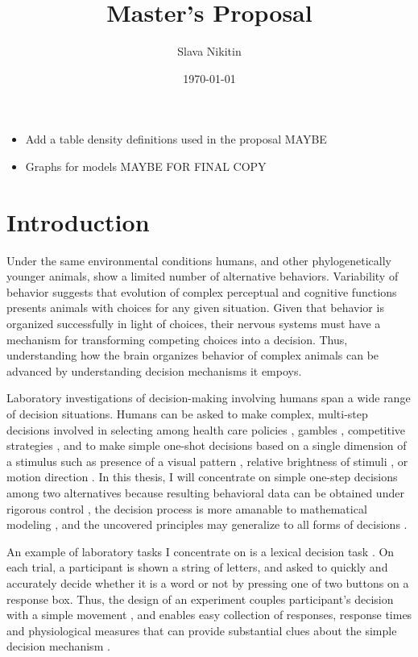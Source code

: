 \documentclass[12pt]{report}
\title{Master's Proposal}
\author{Slava Nikitin}
\date{\today}
\begin{document}
\maketitle

\tableofcontents

\listoftodos
\begin{itemize}
\item Add a table density definitions used in the proposal
	  MAYBE
\item Graphs for models
	  MAYBE FOR FINAL COPY
\end{itemize}

\chapter{Introduction}

Under the same environmental conditions humans, and other phylogenetically younger animals, show a limited number of alternative behaviors. Variability of behavior suggests that evolution of complex perceptual and cognitive functions presents animals with choices for any given situation. Given that behavior is organized successfully in light of choices, their nervous systems must have a mechanism for transforming competing choices into a decision. Thus, understanding how the brain organizes behavior of complex animals can be advanced by understanding decision mechanisms it empoys.

Laboratory investigations of decision-making involving humans span a wide range of decision situations. Humans can be asked to make complex, multi-step decisions involved in selecting among health care policies \citep{PetHar2014}, gambles \citep{TveKah1981}, competitive strategies \citep{Cam2003}, and to make simple one-shot decisions based on a single dimension of a stimulus such as presence of a visual pattern \citep{Smi1995}, relative brightness of stimuli \citep{RatRou1998}, or motion direction \citep{RatMck2008}. In this thesis, I will concentrate on simple one-step decisions among two alternatives because resulting behavioral data can be obtained under rigorous control \citep{ZanTow2013}, the decision process is more amanable to mathematical modeling \citep{Coo1983,LewFar2010}, and the uncovered principles may generalize to all forms of decisions \citep{ShaKia2013}.

An example of laboratory tasks I concentrate on is a lexical decision task \citep{Wag2009}. On each trial, a participant is shown a string of letters, and asked to quickly and accurately decide whether it is a word or not by pressing one of two buttons on a response box. Thus, the design of an experiment couples participant's decision with a simple movement \citep{ZanTow2013}, and enables easy collection of responses, response times and physiological measures that can provide substantial clues about the simple decision mechanism \citep{Luc1986,ShaKia2013,MulMaa2014}.
\end{document}
